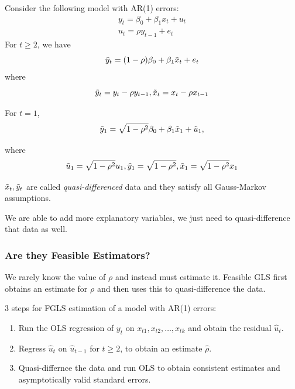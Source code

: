 \documentclass[11pt]{article}
\begin{document}
\begin{shaded}
    Consider the following model with AR(1) errors:
    \begin{gather*}
        y_t = \beta_0 + \beta_1 x_t + u_t \\
        u_t = \rho y_{t-1} + e_t
    \end{gather*}
    For $t\geq 2$, we have
    \begin{equation}
        \label{quasi difference t 2}
        \Tilde{y}_t = (1-\rho) \beta_0 + \beta_1 \Tilde{x}_t + e_t
    \end{equation}
    where 
    \[\Tilde{y}_t = y_t - \rho y_{t-1}, \Tilde{x}_t = x_t - \rho x_{t-1}\]

    For $t=1$, 
    \begin{equation}
        \label{quasi difference t 1}
        \Tilde{y}_1 = \sqrt{1-\rho^2} \beta_0 + \beta_1 \Tilde{x}_1 + \Tilde{u}_1,
    \end{equation}

    where
    \[\Tilde{u}_1 = \sqrt{1-\rho^2} u_1, \Tilde{y}_1 = \sqrt{1-\rho^2}, \Tilde{x}_1 = \sqrt{1-\rho^2}x_1\]

    $\Tilde{x}_t, \Tilde{y}_t$ are called \textit{quasi-differenced} data and they satisfy all Gauss-Markov assumptions.

    \begin{note}
        We are able to add more explanatory variables, we just need to quasi-difference that data as well.
    \end{note}
\end{shaded}

\subsubsection{Are they Feasible Estimators?}

We rarely know the value of $\rho$ and instead must estimate it. Feasible GLS first obtains an estimate for $\rho$ and then uses this to quasi-difference the data.

\begin{mdframed}
    3 steps for FGLS estimation of a model with AR(1) errors:
    \begin{enumerate}
        \item Run the OLS regression of $y_t$ on $x_{t1}, x_{t2}, \ldots, x_{tk}$ and obtain the residual $\hat{u}_t$.

        \item Regress $\hat{u}_t$ on $\hat{u}_{t-1}$ for $t\geq 2$, to obtain an estimate $\hat{\rho}$.

        \item Quasi-differnce the data and run OLS to obtain consistent estimates and asymptotically valid standard errors.
    \end{enumerate}
\end{mdframed}
\end{document}
